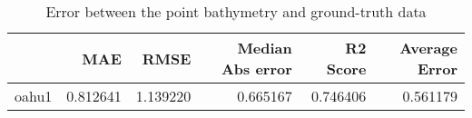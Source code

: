 \begin{table}[h!]
\caption{Error between the point bathymetry and ground-truth data}
\label{tab:oahu1_lidar_error}
\begin{tabular}{lrrrrr}
\toprule
 & MAE & RMSE & Median Abs error & R2 Score & Average Error \\
\midrule
oahu1 & 0.812641 & 1.139220 & 0.665167 & 0.746406 & 0.561179 \\
\bottomrule
\end{tabular}
\end{table}
